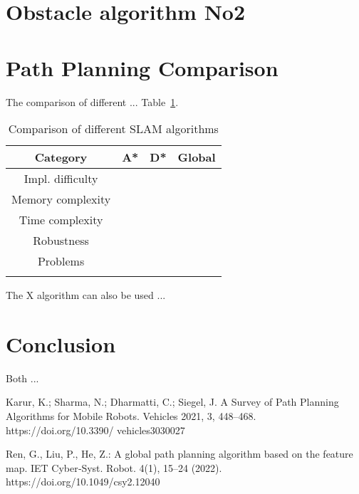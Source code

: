 \documentclass[12pt, a4paper, onecolumn]{article}
\begin{document}
\section{Obstacle algorithm No2}

\section{Path Planning Comparison}
The comparison of different ...
Table~\ref{tab:path_algorithms}.
\begin{table}[h!]
  \begin{center}
    \begin{tabular}[c]{|c || c c c |}
      \hline
       Category        &  A*            & D*            & Global     \\
      \hline
      Impl. difficulty &         &  &      \\
      \hline
      Memory complexity&          &           &      \\
      \hline
      Time complexity  &          &         &      \\
      \hline
      Robustness       &           &         &      \\
      \hline
      Problems         &  &  & \\
                       &  &  & \\
      \hline
    \end{tabular}
  \end{center}
  \caption{Comparison of different SLAM algorithms}
  \label{tab:path_algorithms}
\end{table}
The X algorithm can also be used ...

\section{Conclusion}

Both ... 
\newpage
\begin{thebibliography}{9}

Karur, K.; Sharma, N.;
Dharmatti, C.; Siegel, J. A Survey of
Path Planning Algorithms for Mobile
Robots. Vehicles 2021, 3, 448–468.
https://doi.org/10.3390/
vehicles3030027

Ren, G., Liu, P., He, Z.: A
global path planning algorithm based on the feature
map. IET Cyber‐Syst. Robot. 4(1), 15–24 (2022).
https://doi.org/10.1049/csy2.12040


\end{thebibliography}
\end{document}
